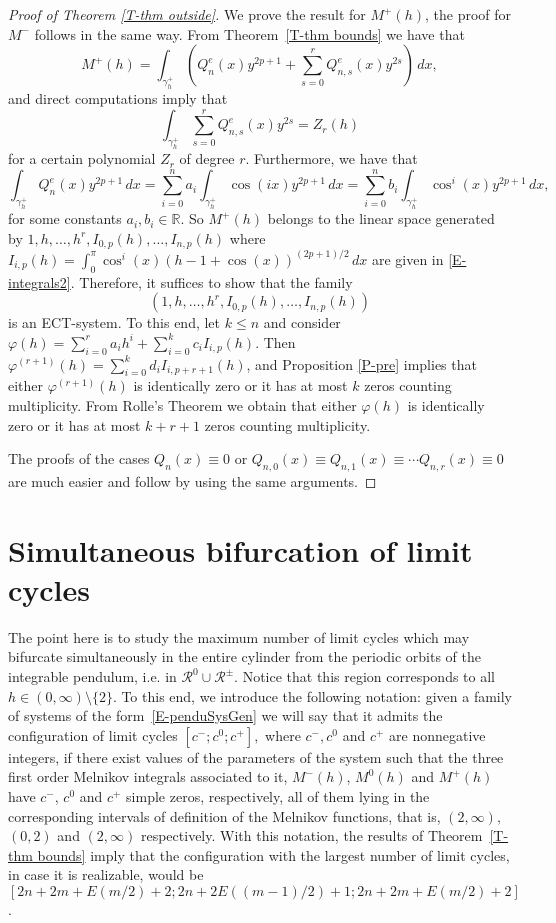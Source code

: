 \documentclass[12pt,psamsfonts]{amsart}
\begin{document}
\begin{proof}[Proof of Theorem \ref{T-thm outside}]

We prove the result for $M^+(h)$, the proof for $M^-$ follows in the
same way. From Theorem~\ref{T-thm bounds} we have that
$$M^+(h)=\int_{\gamma_h^+}\left(Q^e_{n}(x)
y^{2p+1}+\sum_{s=0}^{r}Q^e_{n,s}(x)y^{2s}\right)\, dx,$$ and direct computations
imply that
$$\int_{\gamma_h^+}\sum_{s=0}^{r}Q^e_{n,s}(x)y^{2s}=Z_r(h)$$
 for a certain polynomial $Z_r$ of  degree $ r$. Furthermore, we have that
$$\int_{\gamma_h^+}Q^e_{n}(x)
y^{2p+1}\, dx=\sum_{i=0}^na_i\int_{\gamma_h^+}\cos(ix)y^{2p+1}\, dx
                    =\sum_{i=0}^nb_i\int_{\gamma_h^+}\cos^i(x)y^{2p+1}\, dx,
$$
for some constants $a_i,b_i\in{\mathbb{R}}$. So $M^+(h)$ belongs to the linear
space generated by $1,h,\ldots,h^r,I_{0,p}(h),\ldots,I_{n,p}(h)$
where $I_{i,p}(h)=\int_{0}^\pi\cos^i(x)(h-1+\cos(x))^{(2p+1)/2}\,
dx$ are given in \eqref{E-integrals2}. Therefore, it suffices to
show that the family
$$\left(1,h,\ldots,h^r,I_{0,p}(h),\ldots,I_{n,p}(h)\right)$$
is an ECT-system. To this end, let $k\le n$ and consider
$\varphi(h)=\sum_{i=0}^r a_i h^i+ \sum_{i=0}^kc_iI_{i,p}(h).$ Then
$\varphi^{(r+1)}(h)=\sum_{i=0}^kd_iI_{i,p+r+1}(h)$, and Proposition
\ref {P-pre} implies that  either $\varphi^{(r+1)}(h)$ is
identically zero or it has at most $k$ zeros counting multiplicity.
From Rolle's Theorem we obtain that either ${\varphi}(h)$ is identically
zero or it has at most $k+r+1$ zeros counting multiplicity.

The proofs of the cases $Q_{n}(x)\equiv0$ or  $Q_{n,0}(x)\equiv
 Q_{n,1}(x)\equiv\cdots Q_{n,r}(x)\equiv0$ are much easier and
 follow by using the same arguments.
\end{proof}

\section{Simultaneous bifurcation of limit cycles}
 \label{SS-simultaneous}

The point here is to study the maximum number of limit cycles which may bifurcate simultaneously
in the entire cylinder from the periodic orbits of the integrable pendulum, i.e. in
$\mathcal{R}^0\cup\mathcal{R}^\pm$. Notice that this region corresponds  to all
$h\in(0,\infty)\setminus\{2\}$. To this end, we introduce the following notation: given a family
of systems of the form~\eqref{E-penduSysGen} we will say that it admits the configuration of limit
cycles $[c^-;c^0;c^+],$ where $c^-,c^0$ and $c^+$ are nonnegative integers, if there exist values
of the parameters of the system such that the three first order Melnikov integrals associated to
it, $M^-(h)$, $M^0(h)$ and $M^+(h)$ have $c^-$, $c^0$ and $c^+$ simple zeros, respectively, all
of them lying in the corresponding intervals of definition of the Melnikov functions,
that is, $(2,\infty),$ $(0,2)$
and $(2,\infty)$ respectively. With this notation, the results of Theorem~\ref{T-thm bounds} imply that
 the  configuration with the largest number of limit cycles, in case it is realizable,
 would be $[2n+2m+E(m/2)+2;
2n+2E((m-1)/2)+1;2n+2m+E(m/2)+2]$.\\
\end{document}
